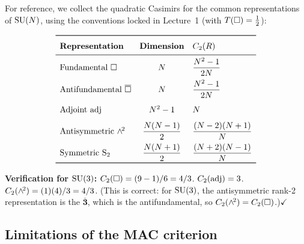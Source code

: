 \documentclass[11pt,a4paper]{article}
\begin{document}
For reference, we collect the quadratic Casimirs for the common
representations of $\mathrm{SU}(N)$, using the conventions locked in Lecture~1
(with $T(\square) = \tfrac{1}{2}$):

\begin{equation}\label{eq:casimirs}
\renewcommand{\arraystretch}{1.5}
\begin{array}{l c l}
\toprule
\textbf{Representation} & \textbf{Dimension} & C_2(R) \\
\midrule
\text{Fundamental } \fund & N & \dfrac{N^2 - 1}{2N} \\[6pt]
\text{Antifundamental } \antifund & N & \dfrac{N^2 - 1}{2N} \\[6pt]
\text{Adjoint } \adj & N^2 - 1 & N \\[6pt]
\text{Antisymmetric } \antisym & \dfrac{N(N-1)}{2} &
  \dfrac{(N-2)(N+1)}{N} \\[6pt]
\text{Symmetric } \sym & \dfrac{N(N+1)}{2} &
  \dfrac{(N+2)(N-1)}{N} \\
\bottomrule
\end{array}
\end{equation}

\textbf{Verification for $\mathrm{SU}(3)$:}
$C_2(\square) = (9-1)/6 = 4/3$.
$C_2(\mathrm{adj}) = 3$.
$C_2(\wedge^{\!2}) = (1)(4)/3 = 4/3$.
(This is correct: for $\mathrm{SU}(3)$, the antisymmetric rank-2 representation
is the $\overline{\mathbf{3}}$, which is the antifundamental, so
$C_2(\wedge^{\!2}) = C_2(\square)$.)\quad$\checkmark$


\subsection{Limitations of the MAC criterion}
\end{document}
